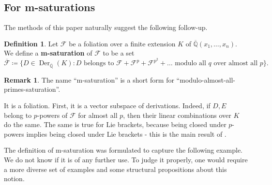 \documentclass{amsart}
\newcommand{\F}{\mathcal{F}}
\newcommand{\op}{\operatorname}
\theoremstyle{definition}
\newtheorem{defin}[thm]{Definition}
\newtheorem{remark}[thm]{Remark}
\begin{document}
\subsection{For m-saturations}
The methods of this paper naturally suggest the following follow-up.

\begin{defin}
    Let $\F$ be a foliation over a finite extension $K$ of $\overline{\mathbb{Q}}(x_1,\ldots,x_n)$. We define a \textbf{m-saturation} of $\F$ to be a set 
    \[
    \overline{\F}\coloneqq \{D\in \op{Der}_{\overline{\mathbb{Q}}}(K): \text{$D$ belongs to $\F+\F^p+\F^{p^2}+\ldots$ modulo all $q$ over almost all $p$}\}.
    \]
\end{defin}

\begin{remark}
    The name ``m-saturation'' is a short form for ``modulo-almost-all-primes-saturation''. 

    It is a foliation. First, it is a vector subspace of derivations. Indeed, if $D, E$ belong to $p$-powers of $\F$ for almost all $p$, then their linear combinations over $K$ do the same. The same is true for Lie brackets, because being closed under $p$-powers implies being closed under Lie brackets - this is the main result of \cite{p-powers-give-lie-brackets}.
\end{remark}



The definition of m-saturation was formulated to capture the following example. We do not know if it is of any further use. To judge it properly, one would require a more diverse set of examples and some structural propositions about this notion.
\end{document}
